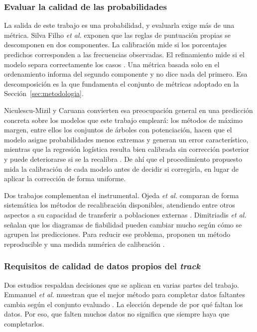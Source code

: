 \subsubsection{Evaluar la calidad de las probabilidades}

La salida de este trabajo es una probabilidad, y evaluarla exige más de una
métrica. Silva Filho \textit{et al.} exponen que las reglas de puntuación
propias se descomponen en dos componentes. La calibración mide si los
porcentajes predichos corresponden a las frecuencias observadas. El
refinamiento mide si el modelo separa correctamente los casos
\cite{silvafilho_calibration_2023}. Una métrica basada solo en el
ordenamiento informa del segundo componente y no dice nada del primero. Esa
descomposición es la que fundamenta el conjunto de métricas adoptado en la
Sección~\ref{sec:metodologia}.

Niculescu-Mizil y Caruana convierten esa preocupación general en una
predicción concreta sobre los modelos que este trabajo empleará: los métodos
de máximo margen, entre ellos los conjuntos de árboles con potenciación,
hacen que el modelo asigne probabilidades menos extremas y generan un error
característico, mientras que la regresión logística resulta bien
calibrada sin corrección posterior y puede deteriorarse si se la recalibra
\cite{niculescumizil_probabilities_2005}. De ahí que el procedimiento
propuesto mida la calibración de cada modelo antes de decidir si corregirla,
en lugar de aplicar la corrección de forma uniforme.

Dos trabajos complementan el instrumental. Ojeda \textit{et al.} comparan de
forma sistemática los métodos de recalibración disponibles, atendiendo entre
otros aspectos a su capacidad de transferir a poblaciones externas
\cite{ojeda_calibrating_2023}. Dimitriadis \textit{et al.} señalan que los diagramas de fiabilidad pueden
cambiar mucho según cómo se agrupen las predicciones. Para reducir ese
problema, proponen un método reproducible y una medida numérica de
calibración \cite{dimitriadis_reliability_2021}.

\subsubsection{Requisitos de calidad de datos propios del \textit{track}}

Dos estudios respaldan decisiones que se aplican en varias partes del trabajo. Emmanuel \textit{et al.} muestran que el mejor método para completar datos
faltantes cambia según el conjunto evaluado \cite{emmanuel_missing_2021}. La
elección depende de por qué faltan los datos. Por eso, que falten muchos
datos no significa que siempre haya que completarlos.

